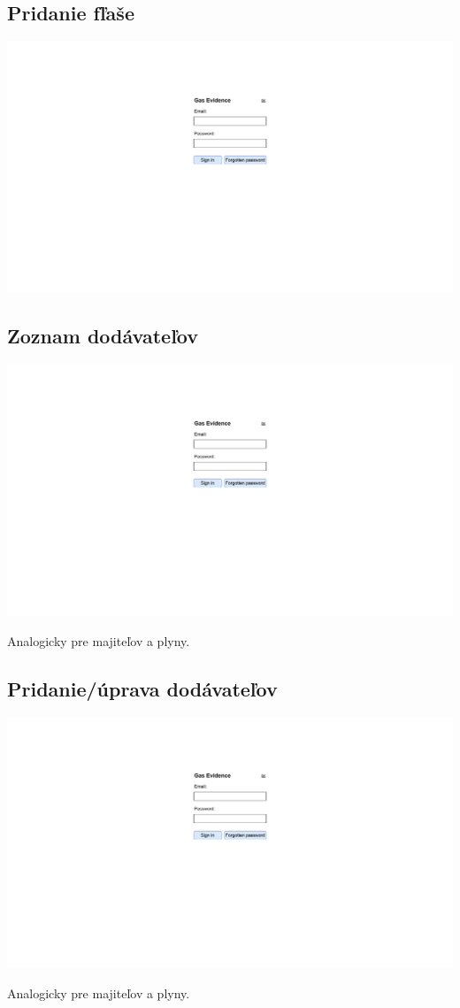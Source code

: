 \documentclass{zah}
\begin{document}
\subsection{Pridanie fľaše}
\begin{center}
\includegraphics[width=.7\textwidth,page=6]{navrh-assets/ui}
\end{center}


\subsection{Zoznam dodávateľov}
\begin{center}
\includegraphics[width=.7\textwidth,page=7]{navrh-assets/ui}
\end{center}
Analogicky pre majiteľov a plyny.

\subsection{Pridanie/úprava dodávateľov}
\begin{center}
\includegraphics[width=.7\textwidth,page=8]{navrh-assets/ui}
\end{center}
Analogicky pre majiteľov a plyny.
\end{document}
